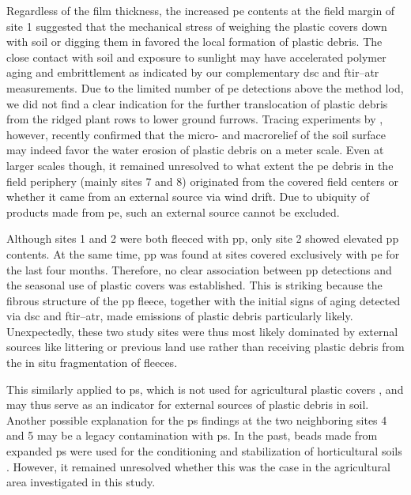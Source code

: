 Regardless of the film thickness, the increased \ac{pe} contents at the field margin of site 1 suggested that the mechanical stress of weighing the plastic covers down with soil or digging them in favored the local formation of plastic debris. The close contact with soil and exposure to sunlight may have accelerated polymer aging and embrittlement as indicated by our complementary \ac{dsc} and \ac{ftir}--\ac{atr} measurements.
Due to the limited number of \ac{pe} detections above the method \ac{lod}, we did not find a clear indication for the further translocation of plastic debris from the ridged plant rows to lower ground furrows. Tracing experiments by \citet{LaermannsTracing2021}, however, recently confirmed that the micro- and macrorelief of the soil surface may indeed favor the water erosion of plastic debris on a meter scale.
Even at larger scales though, it remained unresolved to what extent the \ac{pe} debris in the field periphery (mainly sites 7 and 8) originated from the covered field centers or whether it came from an external source via wind drift. Due to ubiquity of products made from \ac{pe}, such an external source cannot be excluded.

Although sites 1 and 2 were both fleeced with \ac{pp}, only site 2 showed elevated \ac{pp} contents. At the same time, \ac{pp} was found at sites covered exclusively with \ac{pe} for the last four months. Therefore, no clear association between \ac{pp} detections and the seasonal use of plastic covers was established. This is striking because the fibrous structure of the \ac{pp} fleece, together with the initial signs of aging detected via \ac{dsc} and \ac{ftir}--\ac{atr}, made emissions of plastic debris particularly likely.
Unexpectedly, these two study sites were thus most likely dominated by external sources like littering or previous land use rather than receiving plastic debris from the in situ fragmentation of fleeces.

This similarly applied to \ac{ps}, which is not used for agricultural plastic covers \citep{BertlingKunststoffe2021}, and may thus serve as an indicator for external sources of plastic debris in soil. Another possible explanation for the \ac{ps} findings at the two neighboring sites 4 and 5 may be a legacy contamination with \ac{ps}. In the past, beads made from expanded \ac{ps} were used for the conditioning and stabilization of horticultural soils \citep{MaghchicheUse2010}. However, it remained unresolved whether this was the case in the agricultural area investigated in this study.

